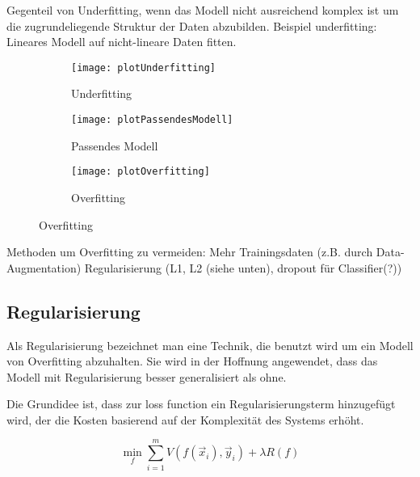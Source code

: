 Gegenteil von Underfitting, wenn das Modell nicht ausreichend komplex ist um die zugrundeliegende Struktur der Daten abzubilden. 
Beispiel underfitting: Lineares Modell auf nicht-lineare Daten fitten.


\begin{figure}[h]
    \centering
    \begin{subfigure}[t]{0.3\textwidth}
		\texttt{[image: plotUnderfitting]}
		\caption{Underfitting}
    \end{subfigure}
    \begin{subfigure}[t]{0.3\textwidth}
		\texttt{[image: plotPassendesModell]}
		\caption{Passendes Modell}
    \end{subfigure}
    \begin{subfigure}[t]{0.3\textwidth}
        \texttt{[image: plotOverfitting]}
        \caption{Overfitting}
    \end{subfigure}
    \label{fig:overfitting}
\end{figure}

Methoden um Overfitting zu vermeiden:
Mehr Trainingsdaten (z.B. durch Data-Augmentation)
Regularisierung (L1, L2 (siehe unten), dropout für Classifier(?))


\subsection{Regularisierung}

Als Regularisierung bezeichnet man eine Technik, die benutzt wird um ein Modell von Overfitting abzuhalten.
Sie wird in der Hoffnung angewendet, dass das Modell mit Regularisierung besser generalisiert als ohne.

Die Grundidee ist, dass zur loss function ein Regularisierungsterm hinzugefügt wird, 
der die Kosten basierend auf der Komplexität des Systems erhöht.

\begin{equation}
	\min_f \sum\limits_{i=1}^{m} V(f(\vec{x}_i), \vec{y}_i) + \lambda R(f)
\end{equation} 

